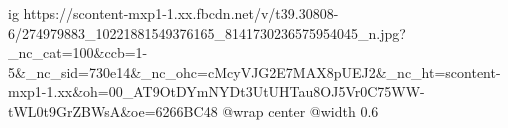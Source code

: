  
 
 
 
 

\ifcmt
  ig https://scontent-mxp1-1.xx.fbcdn.net/v/t39.30808-6/274979883_10221881549376165_8141730236575954045_n.jpg?_nc_cat=100&ccb=1-5&_nc_sid=730e14&_nc_ohc=cMcyVJG2E7MAX8pUEJ2&_nc_ht=scontent-mxp1-1.xx&oh=00_AT9OtDYmNYDt3UtUHTau8OJ5Vr0C75WW-tWL0t9GrZBWsA&oe=6266BC48
  @wrap center
  @width 0.6
\fi
